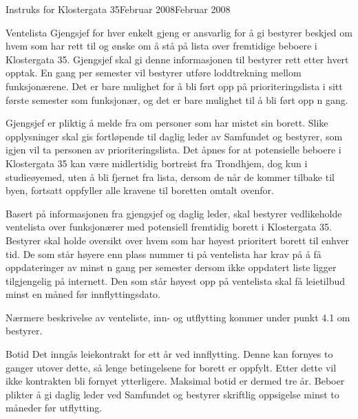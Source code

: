 \begin{instruks}{Instruks for Klostergata 35}{Februar 2008}{Februar 2008}
    \begin{instruksledd}{Ventelista}
        Gjengsjef for hver enkelt gjeng er ansvarlig for å gi bestyrer beskjed om hvem som
        har rett til og ønske om å stå på
        lista over fremtidige beboere i Klostergata 35. Gjengsjef skal gi denne
        informasjonen til bestyrer rett etter hvert
        opptak. En gang per semester vil bestyrer utføre loddtrekning mellom
        funksjonærene. Det er bare mulighet for å bli
        ført opp på prioriteringslista i sitt første semester som funksjonær, og det er
        bare mulighet til å bli ført opp n gang.
        
        Gjengsjef er pliktig å melde fra om personer som har mistet sin borett. Slike
        opplysninger skal gis fortløpende til
        daglig leder av Samfundet og bestyrer, som igjen vil ta personen av
        prioriteringslista. Det åpnes for at potensielle
        beboere i Klostergata 35 kan være midlertidig bortreist fra Trondhjem, dog kun i
        studieøyemed, uten å bli fjernet fra
        lista, dersom de når de kommer tilbake til byen, fortsatt oppfyller alle kravene
        til boretten omtalt ovenfor.
        
        Basert på informasjonen fra gjengsjef og daglig leder, skal bestyrer vedlikeholde
        ventelista over funksjonærer med
        potensiell fremtidig borett i Klostergata 35. Bestyrer skal holde oversikt over
        hvem som har høyest prioritert borett til
        enhver tid. De som står høyere enn plass nummer ti på ventelista har krav på å få
        oppdateringer av minst n gang per
        semester dersom ikke oppdatert liste ligger tilgjengelig på internett. Den som
        står høyest opp på ventelista skal få
        leietilbud minst en måned før innflyttingsdato.
        
        Nærmere beskrivelse av venteliste, inn- og utflytting kommer under punkt 4.1 om
        bestyrer.
    \end{instruksledd}

    \begin{instruksledd}{Botid}
        Det inngås leiekontrakt for ett år ved innflytting. Denne kan fornyes to ganger
        utover dette, så lenge betingelsene for
        borett er oppfylt. Etter dette vil ikke kontrakten bli fornyet ytterligere.
        Maksimal botid er dermed tre år. Beboer plikter
        å gi daglig leder ved Samfundet og bestyrer skriftlig oppsigelse minst to måneder
        før utflytting.
    \end{instruksledd}


\end{instruks}

